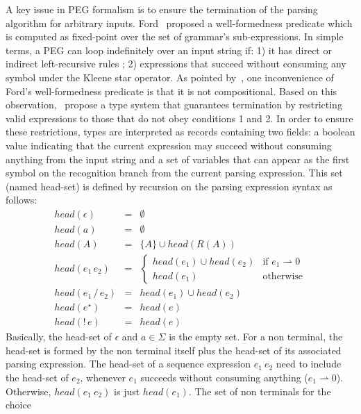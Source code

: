 \documentclass[sigplan,screen]{acmart}
\theoremstyle{definition}
\begin{document}
A key issue in PEG formalism is to ensure the termination of the parsing algorithm
for arbitrary inputs. Ford~\cite{Ford2004} proposed a well-formedness predicate
which is computed as fixed-point over the set of grammar's sub-expressions.
In simple terms, a PEG can loop indefinitely over an input string if: 1) it has
direct or indirect left-recursive rules ; 2) expressions that succeed without
consuming any symbol under the Kleene star operator.
As pointed by~\cite{Ribeiro19}, one inconvenience of Ford's well-formedness predicate
is that it is not compositional.
Based on this observation,~\citet{Ribeiro19} propose a type
system that guarantees termination by restricting valid expressions to those
that do not obey conditions 1 and 2. In order to ensure these restrictions,
types are interpreted as records containing two fields:
a boolean value indicating that the current expression may succeed without
consuming anything from the input string and a set of variables that can
appear as the first symbol on the recognition branch from the current parsing
expression. This set (named head-set) is defined by recursion on the parsing
expression syntax as follows:
\[
  \begin{array}{lcl}
    head (\epsilon) & = & \emptyset \\
    head (a) & = & \emptyset \\
    head (A) & = & \{A\} \cup head(R(A)) \\
    head (e_1\,e_2) & = & \left\{
                          \begin{array}{ll}
                            head(e_1) \cup head(e_2) & \text{if }e_1 \rightharpoonup 0\\
                            head(e_1) & \text{otherwise}
                          \end{array}
                                        \right. \\
    head(e_1\,/\,e_2) & = & head(e_1) \cup head(e_2) \\
    head(e^\star) & = & head(e) \\
    head(!\,e)    & = & head(e)
  \end{array}
\]
Basically, the head-set of $\epsilon$ and $a \in \Sigma$ is the empty set.
For a non terminal, the head-set is formed by the non terminal itself plus
the head-set of its associated parsing expression. The head-set of a sequence
expression $e_1\:e_2$ need to include the head-set of $e_2$, whenever $e_1$
succeeds without consuming anything ($e_1 \rightharpoonup 0$). Otherwise,
$head(e_1\:e_2)$ is just $head(e_1)$. The set of non terminals for the choice
\end{document}

